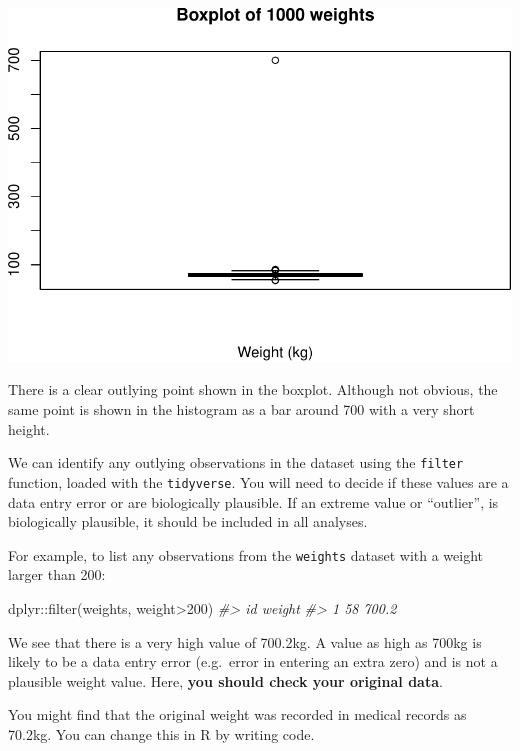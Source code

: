 \documentclass[
]{memoir}
\newenvironment{Shaded}{\begin{snugshade}}{\end{snugshade}}
\newcommand{\CommentTok}[1]{\textcolor[rgb]{0.56,0.35,0.01}{\textit{#1}}}
\newcommand{\DecValTok}[1]{\textcolor[rgb]{0.00,0.00,0.81}{#1}}
\newcommand{\FunctionTok}[1]{\textcolor[rgb]{0.00,0.00,0.00}{#1}}
\newcommand{\NormalTok}[1]{#1}
\newcommand{\SpecialCharTok}[1]{\textcolor[rgb]{0.00,0.00,0.00}{#1}}
\begin{document}
\includegraphics{02.1-Probability_files/figure-latex/unnamed-chunk-3-2.pdf}

There is a clear outlying point shown in the boxplot. Although not obvious, the same point is shown in the histogram as a bar around 700 with a very short height.

We can identify any outlying observations in the dataset using the \texttt{filter} function, loaded with the \texttt{tidyverse}. You will need to decide if these values are a data entry error or are biologically plausible. If an extreme value or ``outlier'', is biologically plausible, it should be included in all analyses.

For example, to list any observations from the \texttt{weights} dataset with a weight larger than 200:

\begin{Shaded}
\begin{Highlighting}[]
\NormalTok{dplyr}\SpecialCharTok{::}\FunctionTok{filter}\NormalTok{(weights, weight}\SpecialCharTok{\textgreater{}}\DecValTok{200}\NormalTok{)}
\CommentTok{\#\textgreater{}   id weight}
\CommentTok{\#\textgreater{} 1 58  700.2}
\end{Highlighting}
\end{Shaded}

We see that there is a very high value of 700.2kg. A value as high as 700kg is likely to be a data entry error (e.g.~error in entering an extra zero) and is not a plausible weight value. Here, \textbf{you should check your original data}.

You might find that the original weight was recorded in medical records as 70.2kg. You can change this in R by writing code.
\end{document}
